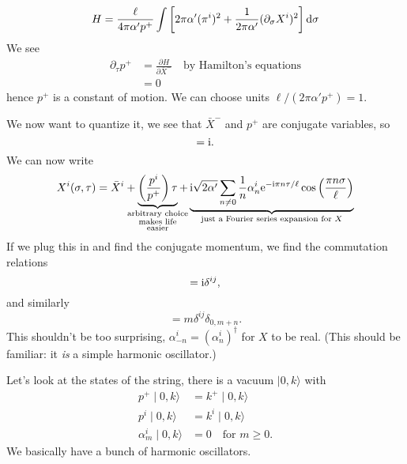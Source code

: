 \begin{equation}
H = \frac{\ell}{4\pi\alpha' p^{+}}\int\left[2\pi\alpha'(\pi^{i})^{2}+\frac{1}{2\pi\alpha'}(\partial_{\sigma}X^{i})^{2}\right]\mathrm{d}\sigma
\end{equation}
We see
\begin{subequations}
  \begin{align}
    \partial_{\tau}p^{+} &= \frac{\partial H}{\partial\bar{X}^{-}}\quad\mbox{by Hamilton's equations}\\
    &= 0
  \end{align}
\end{subequations}
hence $p^{+}$ is a constant of motion. We can choose units $\ell/(2\pi\alpha'p^{+})=1$.

We now want to quantize it, we see that $\bar{X}^{-}$ and $p^{+}$ are
conjugate variables, so
\begin{equation}
[\bar{X}^{-},p^{+}]=\I.
\end{equation}
We can now write
\begin{equation}
X^{i}(\sigma,\tau) = \bar{X}^{i}
+ \underbrace{\left(\frac{p^{i}}{p^{+}}\right)\tau}_{\mathclap{\substack{\text{arbitrary choice}\\\text{makes life}\\\text{easier}}}}
+
\underbrace{\I\sqrt{2\alpha'}\sum_{n\neq0}\frac{1}{n}\alpha^{i}_{n}\E^{-\I\pi n\tau/\ell}\cos\left(\frac{\pi n\sigma}{\ell}\right)}_{\text{just a Fourier series expansion for } X}
\end{equation}
If we plug this in and find the conjugate momentum, we find the
commutation relations
\begin{equation}
[\bar{X}^{i},p^{j}]=\I\delta^{ij},
\end{equation}
and similarly
\begin{equation}
[\alpha^{i}_{m},\alpha^{j}_{n}]=m\delta^{ij}\delta_{0,m+n}.
\end{equation}
This shouldn't be too surprising,
$\alpha^{i}_{-n}=(\alpha^{i}_{n})^{\dagger}$ for $X$ to be real. (This
should be familiar: it \emph{is} a simple harmonic oscillator.)

Let's look at the states of the string, there is a vacuum
$\mid0,k\rangle$ with
\begin{subequations}
\begin{align}
p^{+}\mid0,k\rangle &= k^{+}\mid0,k\rangle\\
p^{i}\mid0,k\rangle &= k^{i}\mid0,k\rangle\\
\alpha^{i}_{m}\mid0,k\rangle &= 0\quad\mbox{for $m\geq0$}.
\end{align}
\end{subequations}
We basically have a bunch of harmonic oscillators.

